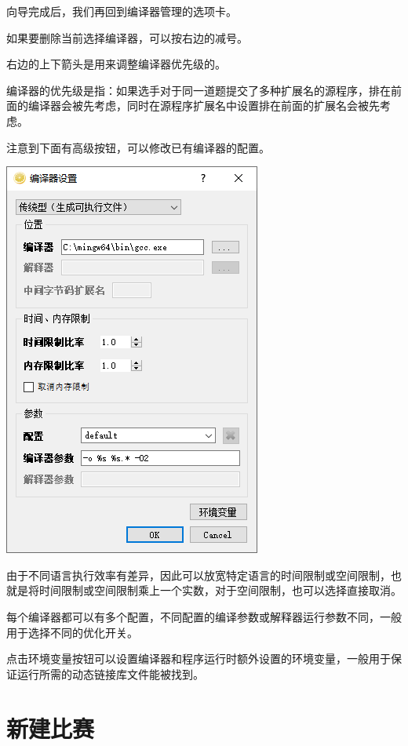 \documentclass[12pt, a4paper]{article}
\begin{document}
向导完成后，我们再回到编译器管理的选项卡。

如果要删除当前选择编译器，可以按右边的减号。

右边的上下箭头是用来调整编译器优先级的。

编译器的优先级是指：如果选手对于同一道题提交了多种扩展名的源程序，排在前面的编译器会被先考虑，同时在源程序扩展名中设置排在前面的扩展名会被先考虑。

注意到下面有高级按钮，可以修改已有编译器的配置。

\begin{center}
\includegraphics[scale=0.7]{pic/compilersettings2.png}
\end{center}	

由于不同语言执行效率有差异，因此可以放宽特定语言的时间限制或空间限制，也就是将时间限制或空间限制乘上一个实数，对于空间限制，也可以选择直接取消。

每个编译器都可以有多个配置，不同配置的编译参数或解释器运行参数不同，一般用于选择不同的优化开关。

点击环境变量按钮可以设置编译器和程序运行时额外设置的环境变量，一般用于保证运行所需的动态链接库文件能被找到。

\newpage

\section{新建比赛}
\end{document}
